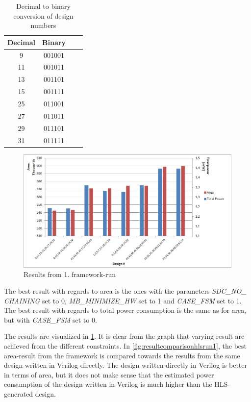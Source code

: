 \begin{table}[hbtp]
    \centering
    \begin{tabular}{cccc}
    \textbf{Decimal} & \textbf{Binary}\\
    \toprule
    9 & 001001 \\
    11 & 001011 \\
    13 & 001101 \\
    15 & 001111 \\
    25 & 011001 \\
    27 & 011011 \\
    29 & 011101 \\
    31 & 011111 \\
    \bottomrule
    \end{tabular}
    \caption{Decimal to binary conversion of design numbers}
    \label{tab:dectobinconstraints}
\end{table}

\begin{figure}[hbpt]
\centering
\includegraphics[width=\textwidth]{../figs/resultGraph.png}
\caption{\label{fig:resultgraphhlsrun1}Results from 1. framework-run}
\end{figure}
The best result with regards to area is the ones with the parameters \textit{SDC\_NO\_ CHAINING} set to 0, \textit{MB\_MINIMIZE\_HW} set to 1 and \textit{CASE\_FSM} set to 1. The best result with regards to total power consumption is the same as for area, but with \textit{CASE\_FSM} set to 0.

The results are visualized in \cref{fig:resultgraphhlsrun1}. It is clear from the graph that varying result are achieved from the different constraints. In \cref{fig:resultcomparisonhlsrun1}, the best area-result from the framework is compared towards the results from the same design written in Verilog directly. The design written directly in Verilog is better in terms of area, but it does not make sense that the estimated power consumption of the design written in Verilog is much higher than the HLS-generated design.

